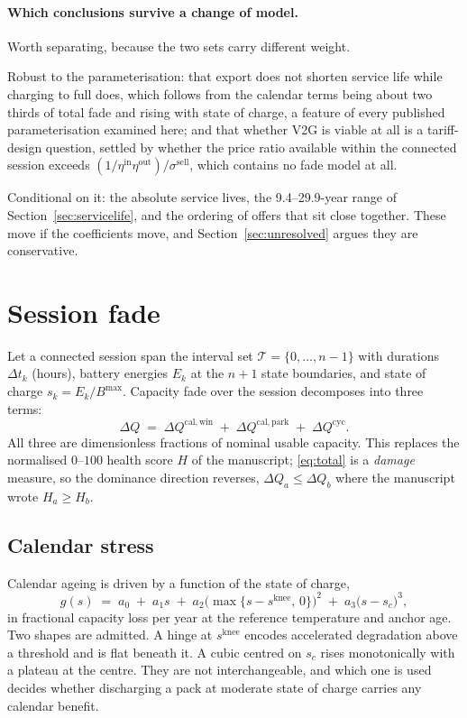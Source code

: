 \documentclass[11pt,a4paper]{article}
\newcommand{\Bmax}{B^{\max}}
\newcommand{\dQ}{\Delta Q}
\newcommand{\etain}{\eta^{\mathrm{in}}}
\newcommand{\etaout}{\eta^{\mathrm{out}}}
\begin{document}
\paragraph{Which conclusions survive a change of model.}
Worth separating, because the two sets carry different weight.

Robust to the parameterisation: that export does not shorten service
life while charging to full does, which follows from the calendar
terms being about two thirds of total fade and rising with state of
charge, a feature of every published parameterisation examined here;
and that whether V2G is viable at all is a tariff-design question,
settled by whether the price ratio available within the connected
session exceeds $(1/\etain\etaout)/\sigma^{\mathrm{sell}}$, which
contains no fade model at all.

Conditional on it: the absolute service lives, the
\numrange{9.4}{29.9}-year range of Section~\ref{sec:servicelife}, and
the ordering of offers that sit close together. These move if the
coefficients move, and Section~\ref{sec:unresolved} argues they are
conservative.

\section{Session fade}

Let a connected session span the interval set $\mathcal{T} =
\{0,\dots,n-1\}$ with durations $\Delta t_k$ (hours), battery energies
$E_k$ at the $n+1$ state boundaries, and state of charge $s_k = E_k /
\Bmax$. Capacity fade over the session decomposes into three terms:
%
\begin{equation}
\dQ \;=\; \dQ^{\mathrm{cal,win}} \;+\; \dQ^{\mathrm{cal,park}}
       \;+\; \dQ^{\mathrm{cyc}} .
\label{eq:total}
\end{equation}
%
All three are dimensionless fractions of nominal usable capacity. This
replaces the normalised $0$--$100$ health score $H$ of the manuscript;
\eqref{eq:total} is a \emph{damage} measure, so the dominance direction
reverses, $\dQ_a \le \dQ_b$ where the manuscript wrote $H_a \ge H_b$.

\subsection{Calendar stress}

Calendar ageing is driven by a function of the state of charge,
%
\begin{equation}
g(s) \;=\; a_0 \;+\; a_1 s \;+\; a_2 \bigl(\max\{s - s^{\mathrm{knee}},\,0\}\bigr)^{2}
          \;+\; a_3 \bigl(s - s_c\bigr)^{3},
\label{eq:gstress}
\end{equation}
%
in fractional capacity loss per year at the reference temperature and
anchor age. Two shapes are admitted. A hinge at $s^{\mathrm{knee}}$
encodes accelerated degradation above a threshold and is flat beneath
it. A cubic centred on $s_c$ rises monotonically with a plateau at the
centre. They are not interchangeable, and which one is used decides
whether discharging a pack at moderate state of charge carries any
calendar benefit.
\end{document}
